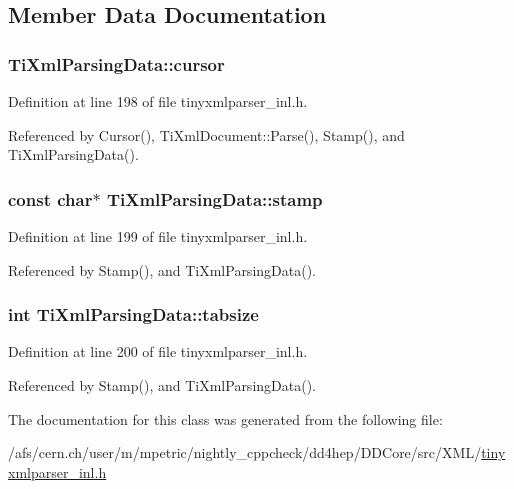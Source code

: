 \subsection{Member Data Documentation}
\hypertarget{class_ti_xml_parsing_data_abee4c6c657f595182a4f8beda4fa1c7d}{
\subsubsection[{cursor}]{ {\bf TiXmlParsingData::cursor}}}
\label{class_ti_xml_parsing_data_abee4c6c657f595182a4f8beda4fa1c7d}


Definition at line 198 of file tinyxmlparser\_\-inl.h.

Referenced by Cursor(), TiXmlDocument::Parse(), Stamp(), and TiXmlParsingData().\hypertarget{class_ti_xml_parsing_data_a0e3c2ea5a8b738d733735ca0318fe4ff}{
\subsubsection[{stamp}]{\setlength{\rightskip}{0pt plus 5cm}const char$\ast$ {\bf TiXmlParsingData::stamp}}}
\label{class_ti_xml_parsing_data_a0e3c2ea5a8b738d733735ca0318fe4ff}


Definition at line 199 of file tinyxmlparser\_\-inl.h.

Referenced by Stamp(), and TiXmlParsingData().\hypertarget{class_ti_xml_parsing_data_ab9d6aea2833e38aaef440e49c22a05ca}{
\subsubsection[{tabsize}]{\setlength{\rightskip}{0pt plus 5cm}int {\bf TiXmlParsingData::tabsize}}}
\label{class_ti_xml_parsing_data_ab9d6aea2833e38aaef440e49c22a05ca}


Definition at line 200 of file tinyxmlparser\_\-inl.h.

Referenced by Stamp(), and TiXmlParsingData().

The documentation for this class was generated from the following file:\begin{DoxyCompactItemize}
\item 
/afs/cern.ch/user/m/mpetric/nightly\_\-cppcheck/dd4hep/DDCore/src/XML/\hyperlink{tinyxmlparser__inl_8h}{tinyxmlparser\_\-inl.h}\end{DoxyCompactItemize}
